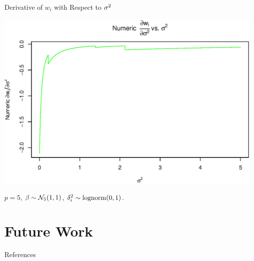 \documentclass[11pt,leqno]{beamer}
\begin{document}
\begin{frame}{Derivative of $w_i$ with Respect to $\sigma^2$}
\begin{centering}
\includegraphics[scale=.5]{sigma_deriva_numeric.eps}
\end{centering}
$p=5$, $\beta \sim \mathcal{N}_5(1,1)$, $\delta_i^2\sim \mathrm{lognorm}(0,1)$.
\end{frame}

\section{Future Work}



\begin{frame}[allowframebreaks]{References}



\end{frame}
\end{document}
